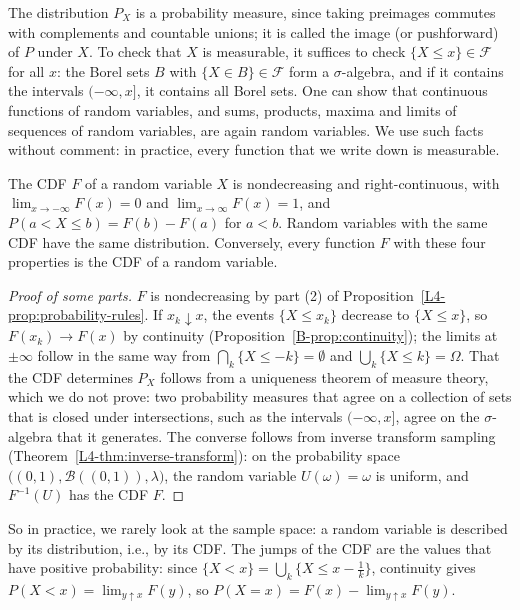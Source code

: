 The distribution $P_X$ is a probability measure, since taking preimages commutes with complements and countable unions; it is called the image (or pushforward) of $P$ under $X$. To check that $X$ is measurable, it suffices to check $\{X \leq x\} \in \mathcal{F}$ for all $x$: the Borel sets $B$ with $\{X \in B\} \in \mathcal{F}$ form a $\sigma$-algebra, and if it contains the intervals $(-\infty, x]$, it contains all Borel sets. One can show that continuous functions of random variables, and sums, products, maxima and limits of sequences of random variables, are again random variables. We use such facts without comment: in practice, every function that we write down is measurable.

\begin{theorem}\label{B-thm:cdf}
    The CDF $F$ of a random variable $X$ is nondecreasing and right-continuous, with $\lim_{x \to -\infty} F(x) = 0$ and $\lim_{x \to \infty} F(x) = 1$, and $P(a < X \leq b) = F(b) - F(a)$ for $a < b$. Random variables with the same CDF have the same distribution. Conversely, every function $F$ with these four properties is the CDF of a random variable.
\end{theorem}

\begin{proof}[Proof of some parts]
    $F$ is nondecreasing by part (2) of Proposition~\ref{L4-prop:probability-rules}. If $x_k \downarrow x$, the events $\{X \leq x_k\}$ decrease to $\{X \leq x\}$, so $F(x_k) \to F(x)$ by continuity (Proposition~\ref{B-prop:continuity}); the limits at $\pm\infty$ follow in the same way from $\bigcap_k \{X \leq -k\} = \emptyset$ and $\bigcup_k \{X \leq k\} = \Omega$. That the CDF determines $P_X$ follows from a uniqueness theorem of measure theory, which we do not prove: two probability measures that agree on a collection of sets that is closed under intersections, such as the intervals $(-\infty, x]$, agree on the $\sigma$-algebra that it generates. The converse follows from inverse transform sampling (Theorem~\ref{L4-thm:inverse-transform}): on the probability space $\big((0, 1), \mathcal{B}((0, 1)), \lambda\big)$, the random variable $U(\omega) = \omega$ is uniform, and $F^{-1}(U)$ has the CDF $F$.
\end{proof}

So in practice, we rarely look at the sample space: a random variable is described by its distribution, i.e., by its CDF. The jumps of the CDF are the values that have positive probability: since $\{X < x\} = \bigcup_k \{X \leq x - \frac{1}{k}\}$, continuity gives $P(X < x) = \lim_{y \uparrow x} F(y)$, so $P(X = x) = F(x) - \lim_{y \uparrow x} F(y)$.

